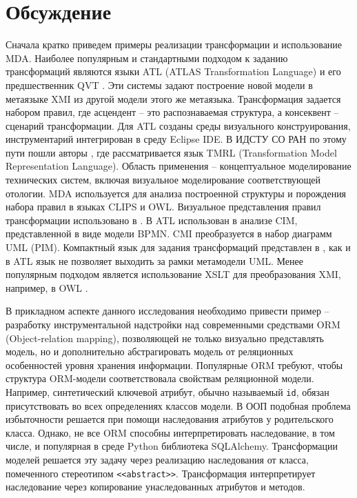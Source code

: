 \documentclass[12pt]{article}
\begin{document}
\section{Обсуждение}
\label{sec:rel}

Сначала кратко приведем примеры реализации трансформации и использование MDA.  Наиболее популярным и стандартными подходом к заданию трансформаций являются языки ATL (ATLAS Transformation Language) и его предшественник QVT \cite{QVT}.  Эти системы задают построение новой модели в метаязыке XMI из другой модели этого же метаязыка.  Трансформация задается набором правил, где асцендент -- это распознаваемая структура, а консеквент -- сценарий трансформации.  Для ATL созданы среды визуального конструирования, инструментарий интегрирован в среду Eclipse IDE.  В ИДСТУ СО РАН по этому пути пошли авторы  \cite{nikita}, где рассматривается язык TMRL (Transformation Model Representation Language).  Область применения -- концептуальное моделирование технических систем, включая визуальное моделирование соответствующей отологии.  MDA используется для анализа построенной структуры и порождения набора правил в языках CLIPS и OWL.  Визуальное представления правил трансформации использовано в \cite{GT}.   В \cite{azis} ATL использован в анализе CIM, представленной в виде модели BPMN.  CMI преобразуется в набор диаграмм UML (PIM).  Компактный язык для задания трансформаций представлен в \cite{kuz}, как и в ATL язык не позволяет выходить за рамки метамодели UML.  Менее популярным подходом является использование XSLT для преобразования XMI, например, в OWL \cite{uml2owl}.

В прикладном аспекте данного исследования необходимо привести пример -- разработку инструментальной надстройки над современными средствами ORM (Object-relation mapping), позволяющей не только визуально представлять модель, но и дополнительно абстрагировать модель от реляционных особенностей уровня хранения информации.  Популярные ORM требуют, чтобы структура ORM-модели соответствовала свойствам реляционной модели.  Например, синтетический ключевой атрибут, обычно называемый \texttt{id}, обязан присутствовать во всех определениях классов модели.  В ООП подобная проблема избыточности решается при помощи наследования атрибутов у родительского класса. Однако, не все ORM способны интерпретировать наследование, в том числе, и популярная в среде Python библиотека SQLAlchemy.  Трансформации моделей решается эту задачу через реализацию наследования от класса, помеченного стереотипом \texttt{<<abstract>>}.  Трансформация интерпретирует наследование через копирование унаследованных атрибутов и методов.  %
\end{document}
